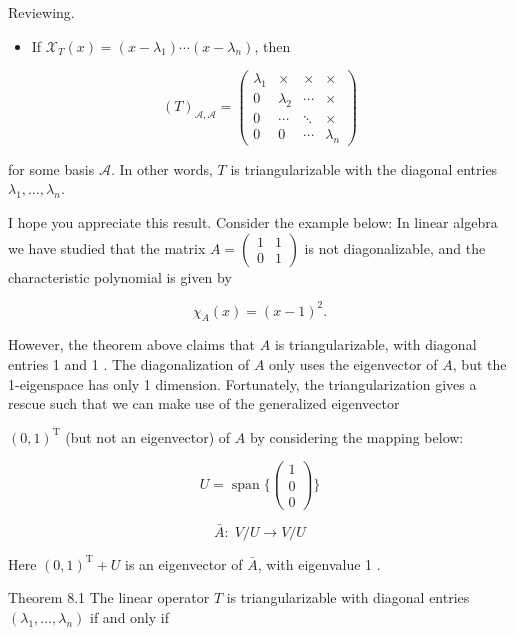 \documentclass[11pt]{article}
\begin{document}
Reviewing.

\begin{itemize}
\item If \({\mathcal{X}}_{T}\left( x\right)  = \left( {x - {\lambda }_1}\right) \cdots \left( {x - {\lambda }_n}\right)\), then
\end{itemize}

\[
{\left( T\right) }_{\mathcal{A},\mathcal{A}} = \left( \begin{matrix} {\lambda }_1 &  \times  &  \times  &  \times  \\  0 & {\lambda }_2 & \cdots &  \times  \\  0 & \cdots &  \ddots  &  \times  \\  0 & 0 & \cdots & {\lambda }_n \end{matrix}\right)
\]

for some basis \(\mathcal{A}\). In other words, \(T\) is triangularizable with the diagonal entries \({\lambda }_1,\ldots ,{\lambda }_n\).

I hope you appreciate this result. Consider the example below: In linear algebra we have studied that the matrix \(A = \left( \begin{array}{ll} 1 & 1 \\  0 & 1 \end{array}\right)\) is not diagonalizable, and the characteristic polynomial is given by

\[
{\chi }_{A}\left( x\right)  = {\left( x - 1\right) }^2.
\]

However, the theorem above claims that \(A\) is triangularizable, with diagonal entries 1 and 1 . The diagonalization of \(A\) only uses the eigenvector of \(A\), but the 1-eigenspace has only 1 dimension. Fortunately, the triangularization gives a rescue such that we can make use of the generalized eigenvector

\({\left( 0,1\right) }^{\mathrm{T}}\) (but not an eigenvector) of \(A\) by considering the mapping below:

\[
U = \operatorname{span}\{ \left( \begin{array}{l} 1 \\  0 \\  0 \end{array}\right) \}
\]

\[
\bar{A} : \;V/U \rightarrow  V/U
\]

Here \({\left( 0,1\right) }^{\mathrm{T}} + U\) is an eigenvector of \(\bar{A}\), with eigenvalue 1 .

Theorem 8.1 The linear operator \(T\) is triangularizable with diagonal entries \(\left( {{\lambda }_1,\ldots ,{\lambda }_n}\right)\) if and only if
\end{document}
